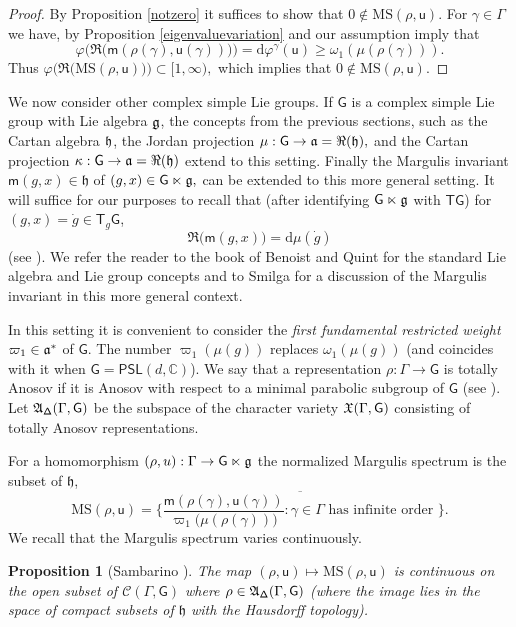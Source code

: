 \documentclass{amsart}
\theoremstyle{plain}
\newtheorem{proposition}{Proposition}[section]
\theoremstyle{definition}
\theoremstyle{remark}
\newcommand{\PSL}{\mathsf{PSL}}
\renewcommand{\sf}[1]{{\mathsf{#1}}}
\newcommand{\h}{{\mathfrak h}}
\newcommand{\C}{\mathbb C}
\newcommand{\<}{\left <}
\renewcommand{\>}{\right >}
\newcommand{\G}{\Gamma}
\newcommand{\g}{\gamma}
\newcommand{\M}{\mathrm{MS}}
\newcommand{\co}{\sf u}
\renewcommand{\C}{\mathbb C}
\newcommand{\dd}{{\mathrm{d}}}
\begin{document}
\begin{proof}
By Proposition \ref{notzero} it suffices to show that $0\notin\M(\rho,\co).$ 
For $\g\in\G$ we have, by Proposition \ref{eigenvaluevariation} and our assumption imply that
$$\varphi\big(\Re\big(\sf m(\rho(\g),\co(\g))\big)\big)=\dd\varphi^{\g}(\co)\geq \omega_1(\mu(\rho(\g))).$$ 
Thus $\varphi\Big(\Re\big(\M(\rho,\co)\big)\Big)\subset[1,\infty),$ which implies that $0\notin\M(\rho,\co).$ 
\end{proof}

We now consider other complex simple Lie groups. If $\sf G$ is a complex simple Lie group with Lie algebra $\frak g$,
the concepts from the previous sections,  such as the Cartan algebra $\frak h$,
the Jordan projection $\mu:\sf G\to\frak a=\Re(\h),$  and the Cartan projection $\kappa:\sf G\to\frak a=\Re(\h)$ extend to this setting.  
Finally the Margulis invariant $\sf m(g,x)\in\h$ of $(g,x)\in\sf G\ltimes\frak g,$ can be extended to this more general setting. 
It will suffice for our purposes to recall that (after identifying $\sf G\ltimes\frak g$ with $\sf T \sf G$)   for $(g,x) = \dot g \in \sf T_g \sf G$,   
$$\Re\big( \sf m(g,x)\big) = \dd\mu(\dot g)$$
(see \cite[Corollary 8.3]{sambarino}).  
We refer the reader to the book of Benoist and Quint \cite{BQ-book} for the standard Lie algebra and Lie group concepts 
and to Smilga \cite{Smig} for a discussion of the Margulis invariant in this more general context.




In this setting it is convenient to consider the \emph{first fundamental restricted weight} $\varpi_1\in\frak a^*$ of $\sf G.$ 
The number $\varpi_1(\mu(g))$ replaces $\omega_1(\mu(g))$ (and coincides with it when $\sf G=\PSL(d,\C)$). 
We say that a representation $\rho:\G\rightarrow \sf G$ is totally Anosov if it is Anosov with respect to a minimal parabolic
subgroup of $\sf G$ (see \cite{GW}).
Let $ \frak A_{\sf\Delta}(\G,\sf G)$  be the subspace of the character variety $\frak X(\G,\sf G)$ consisting of totally Anosov representations. 

For a homomorphism $(\rho,u):\Gamma \to\sf G\ltimes\frak g$ the normalized Margulis spectrum is the subset of $\h$,
$$\M(\rho,\co)=\overline{\Big\{\frac{\sf m(\rho(\g),\co(\g))}{\varpi_1\big(\mu(\rho(\g))\big)}:\g\in\G\text{ has infinite order }\Big\}}.$$
We recall that the Margulis spectrum varies continuously.

\begin{proposition}[{Sambarino \cite[Lemma 2.34]{sambarino}}]\label{continuous}
The map $(\rho,\co)\mapsto \M(\rho,\co)$ is continuous on the open subset of $\mathcal C(\G,\sf G)$ where 
$\rho \in \frak A_{\sf\Delta}(\G,\sf G)$ (where the image lies in the space of compact subsets of $\h$ with the Hausdorff topology).
\end{proposition}
\end{document}
